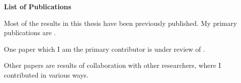 \begin{flushleft}{\huge\textbf{List of Publications} \par}\end{flushleft}

\newrefsection
Most of the results in this thesis have been previously published.
My primary publications are \cite{cloudcom2012,CoCoOn2012,GECON2012,IJNGC2013,AHP2015}.

\printbibliography[title={Primary Publications},heading=subbibliography]
\newrefsection

One paper which I am the primary contributor is under review of .

\newrefsection
Other papers \cite{cloudcomLiZhengCEEM2013,FGCS_LiZhengCDN2014,WangMeiSong2015,SOA_IoT2015,CityDataFusion2016,IngerMewburn2018} are results of collaboration with other researchers, where I contributed in various ways.
\printbibliography[title={Secondary Publications},heading=subbibliography]
\newrefsection
